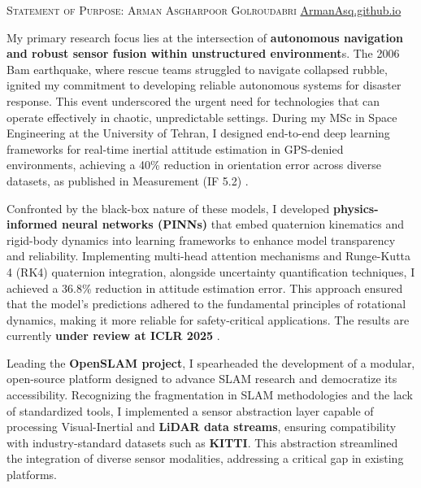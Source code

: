 \documentclass[12pt]{article}
\def\Vrulefill#1#2{
    \vspace{-10pt}
    \leavevmode%
    \leaders%
    \vtop{\hsize=.0025in\vskip#1#2}%
    \hfill%
    \vspace{-2pt}
}
\begin{document}
\justifying

{{ \scshape Statement of Purpose: Arman Asgharpoor Golroudabri }} \hfill \href{https://ArmanAsq.github.io/ }{ArmanAsq.github.io} \vspace{-.5cm}
 \\
\Vrulefill{-.05in}{-}
\vspace{.5cm}

\justifying
My primary research focus lies at the intersection of \textbf{autonomous navigation and robust sensor fusion within unstructured environment}s. The 2006 Bam earthquake, where rescue teams struggled to navigate collapsed rubble, ignited my commitment to developing reliable autonomous systems for disaster response. This event underscored the urgent need for technologies that can operate effectively in chaotic, unpredictable settings. During my MSc in Space Engineering at the University of Tehran, I designed end-to-end deep learning frameworks for real-time inertial attitude estimation in GPS-denied environments, achieving a 40\% reduction in orientation error across diverse datasets, as published in Measurement (IF 5.2) \cite{golroudbari2023generalizable}. 

Confronted by the black-box nature of these models, I developed \textbf{physics-informed neural networks (PINNs)} that embed quaternion kinematics and rigid-body dynamics into learning frameworks to enhance model transparency and reliability. Implementing multi-head attention mechanisms and Runge-Kutta 4 (RK4) quaternion integration, alongside uncertainty quantification techniques, I achieved a 36.8\% reduction in attitude estimation error. This approach ensured that the model’s predictions adhered to the fundamental principles of rotational dynamics, making it more reliable for safety-critical applications. The results are currently \textbf{under review at ICLR 2025} \cite{golroudbari2024te}.

Leading the \textbf{OpenSLAM project}, I spearheaded the development of a modular, open-source platform designed to advance SLAM research and democratize its accessibility. Recognizing the fragmentation in SLAM methodologies and the lack of standardized tools, I implemented a sensor abstraction layer capable of processing Visual-Inertial and\textbf{ LiDAR data streams}, ensuring compatibility with industry-standard datasets such as \textbf{KITTI}. This abstraction streamlined the integration of diverse sensor modalities, addressing a critical gap in existing platforms.
\end{document}
